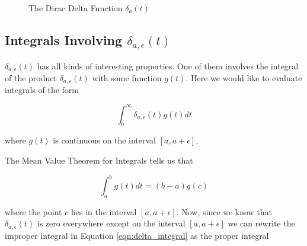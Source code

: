 \documentclass{article}
\theoremstyle{definition}
\begin{document}
\bigskip
\begin{figure}[H]
  \centering
  \caption{The Dirac Delta Function $\delta_{a}(t)$}
  \label{fig:delta_limit}
\end{figure}


\subsection{Integrals Involving $\delta_{a,\epsilon}(t)$}
$\delta_{a,\epsilon}(t)$ has all kinds of interesting properties. One of them involves the integral of the product $\delta_{a,\epsilon}(t)$ with some function $g(t)$.  
Here we would like to evaluate integrals of the form

\bigskip
\begin{equation}
  \int_{0}^{\infty} \delta_{a,\epsilon}(t) g(t) dt
  \label{eqn:delta_integral}
\end{equation}

\bigskip
\noindent
where $g(t)$ is continuous on the interval $[a, a+\epsilon]$. 
 
\bigskip
\noindent
The Mean Value Theorem for Integrals  \cite{wiki:meam_value_theorem_for_integrals}  tells us that

\begin{equation}
  \int_{a}^{b} g(t) dt = (b -a) g(c)
  \label{eqn:mvti}
\end{equation}

\bigskip
\noindent
where the point $c$ lies in the interval $[a, a+\epsilon]$. Now, since we know that $\delta_{a,\epsilon}(t)$ is zero everywhere except on the interval
$[a, a+\epsilon]$ we can rewrite the improper integral in Equation \ref{eqn:delta_integral} as the proper integral
\end{document}
